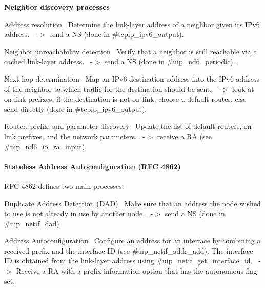 {\bfseries Neighbor discovery processes }~\newline
 \begin{DoxyItemize}
\item Address resolution~\newline
Determine the link-\/layer address of a neighbor given its I\+Pv6 address.~\newline
-\/$>$ send a NS (done in \#tcpip\+\_\+ipv6\+\_\+output). \item Neighbor unreachability detection~\newline
Verify that a neighbor is still reachable via a cached link-\/layer address.~\newline
-\/$>$ send a NS (done in \#uip\+\_\+nd6\+\_\+periodic). \item Next-\/hop determination~\newline
Map an I\+Pv6 destination address into the I\+Pv6 address of the neighbor to which traffic for the destination should be sent.~\newline
-\/$>$ look at on-\/link prefixes, if the destination is not on-\/link, choose a default router, else send directly (done in \#tcpip\+\_\+ipv6\+\_\+output). \item Router, prefix, and parameter discovery~\newline
Update the list of default routers, on-\/link prefixes, and the network parameters.~\newline
-\/$>$ receive a RA (see \#uip\+\_\+nd6\+\_\+io\+\_\+ra\+\_\+input).\end{DoxyItemize}
\hypertarget{a00075_autoconf}{}\paragraph{Stateless Address Autoconfiguration (\+R\+F\+C 4862)}\label{a00075_autoconf}
R\+FC 4862 defines two main processes\+: \begin{DoxyItemize}
\item Duplicate Address Detection (D\+AD)~\newline
Make sure that an address the node wished to use is not already in use by another node.~\newline
-\/$>$ send a NS (done in \#uip\+\_\+netif\+\_\+dad) \item Address Autoconfiguration~\newline
Configure an address for an interface by combining a received prefix and the interface ID (see \#uip\+\_\+netif\+\_\+addr\+\_\+add). The interface ID is obtained from the link-\/layer address using \#uip\+\_\+netif\+\_\+get\+\_\+interface\+\_\+id.~\newline
-\/$>$ Receive a RA with a prefix information option that has the autonomous flag set.\end{DoxyItemize}

